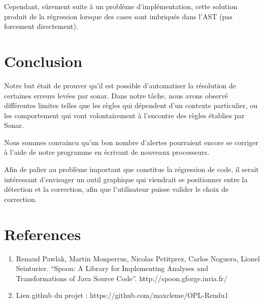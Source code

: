 \documentclass[a4paper]{article}
\begin{document}
\par
Cependant, sûrement suite à un problème d'implémentation, cette solution produit de la régression lorsque des cases sont imbriqués dans l'AST (pas forcement directement).

\section{Conclusion}
\par Notre but était de prouver qu'il est possible d'automatiser la résolution de certaines erreurs levées par sonar. Dans notre tâche, nous avons observé différentes limites telles que les règles qui dépendent d'un contexte particulier, ou les comportement qui vont volontairement à l'encontre des règles établies par Sonar.
\par Nous sommes convaincu qu'un bon nombre d'alertes pourraient encore se corriger à l'aide de notre programme en écrivant de nouveaux processeurs.
\par Afin de palier au problème important que constitue la régression de code, il serait intéressant d'envisager un outil graphique qui viendrait se positionner entre la détection et la correction, afin que l'utilisateur puisse valider le choix de correction.

\section{References}
\begin{enumerate}
	\item  Renaud Pawlak, Martin Monperrus, Nicolas Petitprez, Carlos Noguera, Lionel Seinturier. “Spoon: A Library for Implementing Analyses and Transformations of Java Source Code”. http://spoon.gforge.inria.fr/
	\item Lien github du projet : https://github.com/maxcleme/OPL-Rendu1
\end{enumerate}	
\end{document}
